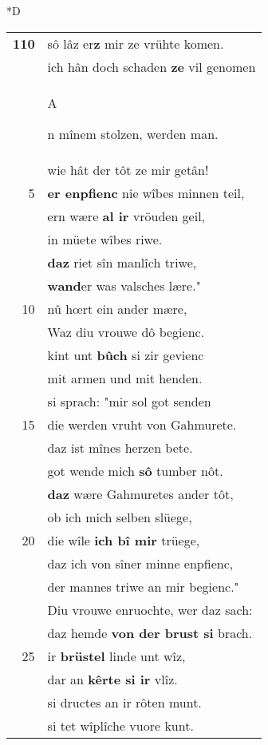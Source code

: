 \documentclass[8pt,a4paper,notitlepage]{article}
\begin{document}
\begin{table}[ht]
\begin{minipage}[t]{0.5\linewidth}
\small
\begin{center}*D
\end{center}
\begin{tabular}{rl}
\textbf{110} & sô lâz er\textbf{z} mir ze vrühte komen.\\ 
 & ich hân doch schaden \textbf{ze} vil genomen\\ 
 & \begin{large}A\end{large}n mînem stolzen, werden man.\\ 
 & wie hât der tôt ze mir getân!\\ 
5 & \textbf{er enpfienc} nie wîbes minnen teil,\\ 
 & ern wære \textbf{al ir} vröuden geil,\\ 
 & in müete wîbes riwe.\\ 
 & \textbf{daz} riet sîn manlîch triwe,\\ 
 & \textbf{wand}er was valsches lære."\\ 
10 & nû hœrt ein ander mære,\\ 
 & Waz diu vrouwe dô begienc.\\ 
 & kint unt \textbf{bûch} si zir gevienc\\ 
 & mit armen und mit henden.\\ 
 & si sprach: "mir sol got senden\\ 
15 & die werden vruht von Gahmurete.\\ 
 & daz ist mînes herzen bete.\\ 
 & got wende mich \textbf{sô} tumber nôt.\\ 
 & \textbf{daz} wære Gahmuretes ander tôt,\\ 
 & ob ich mich selben slüege,\\ 
20 & die wîle \textbf{ich bî mir} trüege,\\ 
 & daz ich von sîner minne enpfienc,\\ 
 & der mannes triwe an mir begienc."\\ 
 & Diu vrouwe enruochte, wer daz sach:\\ 
 & daz hemde \textbf{von der brust si} brach.\\ 
25 & ir \textbf{brüstel} linde unt wîz,\\ 
 & dar an \textbf{kêrte si ir} vlîz.\\ 
 & si dructes an ir rôten munt.\\ 
 & si tet wîplîche vuore kunt.\\ 

\end{tabular}
\end{minipage}
\end{table}
\end{document}
